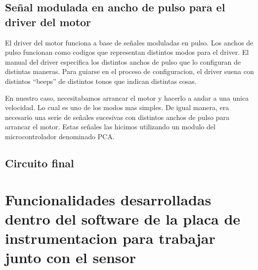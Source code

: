
\subsection{Señal modulada en ancho de pulso para el driver del motor} %
\label{sub:señal_modulada_en_ancho_de_pulso_para_el_driver_del_motor}


El driver del motor funciona a base de señales moduladas en pulso. Los anchos de pulso funcionan como codigos que representan distintos modos para el driver. El manual del driver especifica los distintos anchos de pulso que lo configuran de distintas maneras. Para guiarse en el proceso de configuracion, el driver suena con distintos ``beeps'' de distintos tonos que indican distintas cosas.

En nuestro caso, necesitabamos arrancar el motor y hacerlo a andar a una unica velocidad. Lo cual es uno de los modos mas simples. De igual manera, era necesario una serie de señales sucesivas con distintos anchos de pulso para arrancar el motor. Estas señales las hicimos utilizando un modulo del microcontrolador denominado PCA.






\subsection{Circuito final} %
\label{sub:circuito_final}





\section{Funcionalidades desarrolladas dentro del software de la placa de instrumentacion para trabajar junto con el sensor} %
\label{sec:funcionalidades_desarrolladas_dentro_del_software_de_la_placa_de_instrumentacion_para_trabajar_junto_con_el_sensor}

